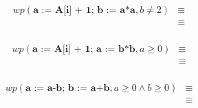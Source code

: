 \documentclass[fleqn,10pt,a4paper]{article}
\begin{document}
\begin{align*}
wp(\textbf{a := A[i] + 1; b := a*a}, b \neq 2) &\equiv \\
                                      &\equiv 
\end{align*}

\subsubsection{}%

\begin{align*}
wp(\textbf{a := A[i] + 1; a := b*b}, a \geq 0) &\equiv \\
                                      &\equiv 
\end{align*}

\subsubsection{}%

\begin{align*}
wp(\textbf{a := a-b; b := a+b}, a \geq 0 \land b \geq 0) &\equiv \\
                                      &\equiv 
\end{align*}

\subsection{}%
\subsubsection{}%
\subsubsection{}%
\subsubsection{}%
\subsection{}%
\subsubsection{}%
\subsubsection{}%
\subsubsection{}%
\end{document}
